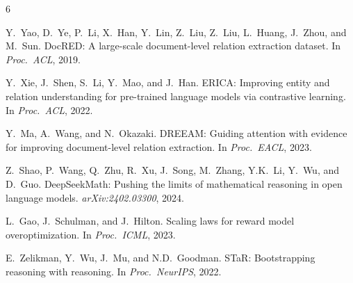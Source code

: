 \documentclass[11pt,a4paper]{article}
\begin{document}
\begin{thebibliography}{6}

Y.~Yao, D.~Ye, P.~Li, X.~Han, Y.~Lin, Z.~Liu, Z.~Liu, L.~Huang, J.~Zhou, and M.~Sun.
DocRED: A large-scale document-level relation extraction dataset.
In \emph{Proc.\ ACL}, 2019.

Y.~Xie, J.~Shen, S.~Li, Y.~Mao, and J.~Han.
ERICA: Improving entity and relation understanding for pre-trained language models via contrastive learning.
In \emph{Proc.\ ACL}, 2022.

Y.~Ma, A.~Wang, and N.~Okazaki.
DREEAM: Guiding attention with evidence for improving document-level relation extraction.
In \emph{Proc.\ EACL}, 2023.

Z.~Shao, P.~Wang, Q.~Zhu, R.~Xu, J.~Song, M.~Zhang, Y.K.~Li, Y.~Wu, and D.~Guo.
DeepSeekMath: Pushing the limits of mathematical reasoning in open language models.
\emph{arXiv:2402.03300}, 2024.

L.~Gao, J.~Schulman, and J.~Hilton.
Scaling laws for reward model overoptimization.
In \emph{Proc.\ ICML}, 2023.

E.~Zelikman, Y.~Wu, J.~Mu, and N.D.~Goodman.
STaR: Bootstrapping reasoning with reasoning.
In \emph{Proc.\ NeurIPS}, 2022.

\end{thebibliography}
\end{document}
